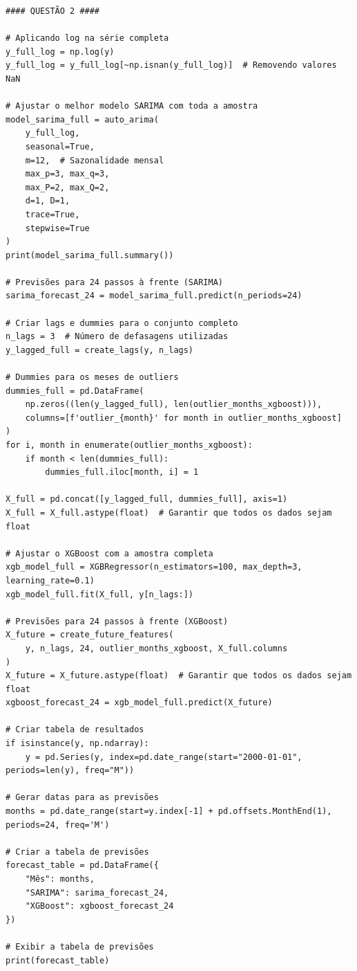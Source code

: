 \documentclass[a4paper, 12pt]{article}
\begin{document}
\begin{lstlisting}[style=Python]
#### QUESTÃO 2 ####

# Aplicando log na série completa
y_full_log = np.log(y)
y_full_log = y_full_log[~np.isnan(y_full_log)]  # Removendo valores NaN

# Ajustar o melhor modelo SARIMA com toda a amostra
model_sarima_full = auto_arima(
    y_full_log,
    seasonal=True,
    m=12,  # Sazonalidade mensal
    max_p=3, max_q=3,
    max_P=2, max_Q=2,
    d=1, D=1,
    trace=True,
    stepwise=True
)
print(model_sarima_full.summary())

# Previsões para 24 passos à frente (SARIMA)
sarima_forecast_24 = model_sarima_full.predict(n_periods=24)

# Criar lags e dummies para o conjunto completo
n_lags = 3  # Número de defasagens utilizadas
y_lagged_full = create_lags(y, n_lags)

# Dummies para os meses de outliers
dummies_full = pd.DataFrame(
    np.zeros((len(y_lagged_full), len(outlier_months_xgboost))),
    columns=[f'outlier_{month}' for month in outlier_months_xgboost]
)
for i, month in enumerate(outlier_months_xgboost):
    if month < len(dummies_full):
        dummies_full.iloc[month, i] = 1

X_full = pd.concat([y_lagged_full, dummies_full], axis=1)
X_full = X_full.astype(float)  # Garantir que todos os dados sejam float

# Ajustar o XGBoost com a amostra completa
xgb_model_full = XGBRegressor(n_estimators=100, max_depth=3, learning_rate=0.1)
xgb_model_full.fit(X_full, y[n_lags:])

# Previsões para 24 passos à frente (XGBoost)
X_future = create_future_features(
    y, n_lags, 24, outlier_months_xgboost, X_full.columns
)
X_future = X_future.astype(float)  # Garantir que todos os dados sejam float
xgboost_forecast_24 = xgb_model_full.predict(X_future)

# Criar tabela de resultados
if isinstance(y, np.ndarray):
    y = pd.Series(y, index=pd.date_range(start="2000-01-01", periods=len(y), freq="M"))

# Gerar datas para as previsões
months = pd.date_range(start=y.index[-1] + pd.offsets.MonthEnd(1), periods=24, freq='M')

# Criar a tabela de previsões
forecast_table = pd.DataFrame({
    "Mês": months,
    "SARIMA": sarima_forecast_24,
    "XGBoost": xgboost_forecast_24
})

# Exibir a tabela de previsões
print(forecast_table)
\end{lstlisting}
\end{document}
